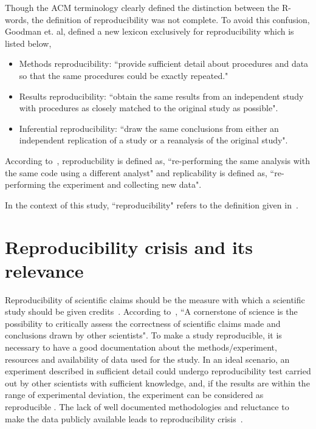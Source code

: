 Though the ACM terminology clearly defined the distinction between the R-words, the definition of reproducibility was not complete. To avoid this confusion, Goodman et. al, defined a new lexicon exclusively for reproducibility \cite{Goodman2016} which is listed below,

\begin{itemize}
\item {Methods reproducibility: ``provide sufficient detail about procedures and data so that the same procedures could be exactly repeated."}
\item {Results reproducibility: ``obtain the same results from an independent study with procedures as closely matched to the original study as possible".}
\item {Inferential reproducibility: ``draw the same conclusions from either an independent replication of a study or a reanalysis of the original study".}
\end{itemize}

According to~\cite{Patil2016}, reproducbility is defined as, ``re-performing the same analysis with the same code using a different analyst" and replicability is defined as, ``re-performing the experiment and collecting new data".

In the context of this study, ``reproducibility" refers to the definition given in~\cite{Patil2016}. 

\section{Reproducibility crisis and its relevance}
Reproducibility of scientific claims should be the measure with which a scientific study should be given credits~\cite{Estimating-reproducibility}. According to~\cite{Plesser2018}, ``A cornerstone of science is the possibility to critically assess the correctness of scientific claims made and conclusions drawn by other scientists".
To make a study reproducible, it is necessary to have a good documentation about the methods/experiment, resources and availability of data used for the study. In an ideal scenario, an experiment described in sufficient detail could undergo reproducibility test carried out by other scientists with sufficient knowledge, and, if the results are within the range of experimental deviation, the experiment can be considered as reproducible \cite{Plesser2018}. The lack of well documented methodologies and reluctance to make the data publicly available leads to reproducibility crisis~\cite{Baker2016}.

